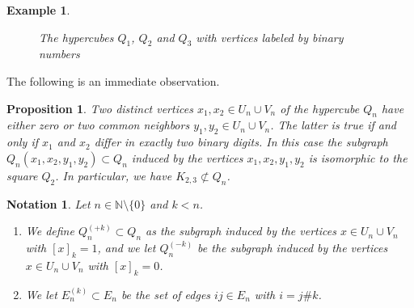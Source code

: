 \documentclass[a4paper]{amsart}
\newcommand{\N}{\mathbb{N}}
\newtheorem{example}[thm]{Example}
\newtheorem{proposition}[thm]{Proposition}
\newtheorem{notation}[thm]{Notation}
\begin{document}
\begin{example}
\begin{figure}[htbp]
        \caption{The hypercubes $Q_1$, $Q_2$ and $Q_3$ with vertices labeled by binary numbers}
        \label{pre::fig:hypercubes_with_binary_labels}
    \end{figure}
\end{example}

The following is an immediate observation.

\begin{proposition}
    \label{hyp::prop:common_neighbors_in_hypercubes}
    Two distinct vertices $x_1, x_2 \in U_n \cup V_n$ of the hypercube $Q_n$ have either zero or two common neighbors $y_1, y_2 \in U_n \cup V_n$. The latter is true if and only if $x_1$ and $x_2$ differ in exactly two binary digits. In this case the subgraph $Q_n(x_1, x_2, y_1, y_2) \subset Q_n$ induced by the vertices $x_1, x_2, y_1, y_2$ is isomorphic to the square $Q_2$.
    In particular, we have $K_{2,3} \not \subset Q_n$.
\end{proposition}


\begin{notation}
    \label{pre::notation:subhypercube_Q_n^(k)_and_E_n^(k)}
    Let $n \in \N \setminus \{0\}$ and $k < n$.
    \begin{enumerate}
        \item We define $Q_n^{(+k)} \subset Q_n$ as the subgraph induced by the vertices $x \in U_n \cup V_n$ with $[x]_k = 1$, and we let $Q_n^{(-k)}$ be the subgraph induced by the vertices $x \in U_n \cup V_n$ with $[x]_k = 0$.
        \item We let $E_n^{(k)} \subset E_n$ be the set of edges $ij \in E_n$ with $i = j \# k$.
    \end{enumerate}
\end{notation}
\end{document}
